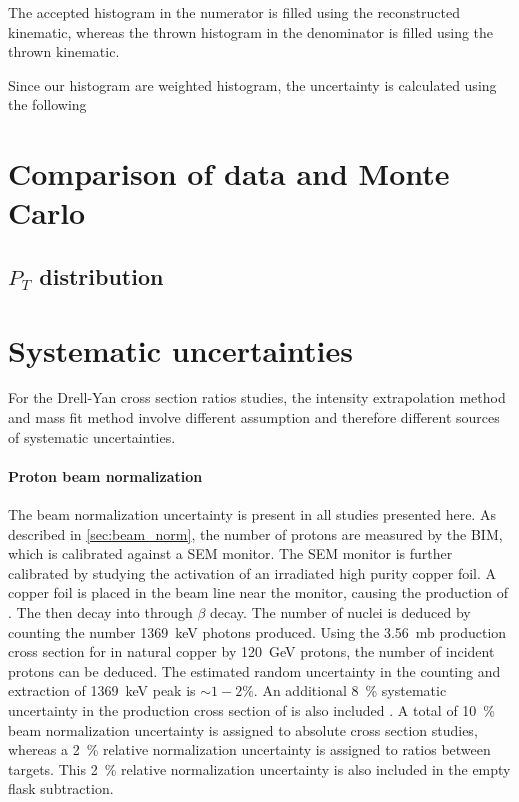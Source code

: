 \documentclass[../main.tex]{subfiles}
\begin{document}
The accepted histogram in the numerator is filled using the reconstructed kinematic, whereas
the thrown histogram in the denominator is filled using the thrown kinematic.

Since our histogram are weighted histogram, the uncertainty is calculated using the following

\section{Comparison of data and Monte Carlo}

\subsection{\texorpdfstring{$P_T$}{P\_T} distribution}



\section{Systematic uncertainties}
For the Drell-Yan cross section ratios studies, the intensity extrapolation method and mass fit
method involve different assumption and therefore different sources of systematic uncertainties.
\paragraph{Proton beam normalization}
The beam normalization uncertainty is present in all studies presented here.
As described in \cref{sec:beam_norm}, the number of protons are measured by the BIM, which is
calibrated against a SEM monitor. The SEM monitor is further calibrated by studying the activation of
an irradiated high purity copper foil. A copper foil is placed in the beam line near the monitor,
causing the production of . The  then decay into  through $\beta$
decay. The number of   nuclei is deduced by counting the number \SI{1369}{\keV} photons
produced. Using the \SI{3.56}{\milli\barn} production cross section for  in natural
copper  by \SI{120}{\GeV} protons, the number of incident protons can be deduced. The estimated
random uncertainty in the counting and extraction of \SI{1369}{\keV} peak is $\sim 1-2\%$.
An additional \SI{8}{\percent} systematic uncertainty in the production cross section of 
is also included \cite{docdb-457,docdb-7708}.
A total of \SI{10}{\percent} beam normalization uncertainty is assigned to absolute cross
section studies, whereas a \SI{2}{\percent} relative normalization uncertainty is assigned to ratios between
targets. This \SI{2}{\percent} relative normalization uncertainty is also included in the empty flask
subtraction.
\end{document}
